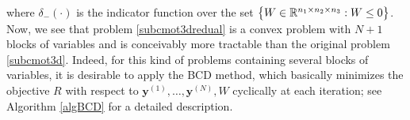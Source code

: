 \documentclass[10pt]{article}
\begin{document}
where $\delta_{-}(\cdot)$ is the indicator function over the set $\big{\{}W\in\mathbb{R}^{n_1 \times n_2 \times n_3}: W\leq0\big{\}}$. Now, we see that problem \eqref{subcmot3dredual} is a convex problem with $N+1$ blocks of variables and is conceivably more tractable than the original problem \eqref{subcmot3d}. Indeed, for this kind of problems containing several blocks of variables, it is desirable to apply the BCD method, which basically minimizes the objective $R$ with respect to $ \bm{y}^{(1)},\dots, \bm{y}^{(N)},W$ cyclically at each iteration; see Algorithm \ref{algBCD} for a detailed description.

\end{document}
